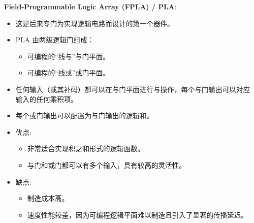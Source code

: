 \begin{frame}{\textbf{Field-Programmable Logic Array (FPLA) / PLA}:}
\begin{itemize}
\tightlist
\item
    这是后来专门为实现逻辑电路而设计的第一个器件。
\item
    PLA 由两级逻辑门组成：

    \begin{itemize}
    \tightlist
    \item
    可编程的``线与''与门平面。
    \item
    可编程的``线或''或门平面。
    \end{itemize}
\item
    任何输入（或其补码）都可以在与门平面进行与操作，每个与门输出可以对应输入的任何乘积项。
\item
    每个或门输出可以配置为与门输出的逻辑和。
\item
    优点:

    \begin{itemize}
    \tightlist
    \item
    非常适合实现积之和形式的逻辑函数。
    \item
    与门和或门都可以有多个输入，具有较高的灵活性。
    \end{itemize}
\item
    缺点:

    \begin{itemize}
    \tightlist
    \item
    制造成本高。
    \item
    速度性能较差，因为可编程逻辑平面难以制造且引入了显著的传播延迟。
    \end{itemize}
\end{itemize}
\end{frame}

